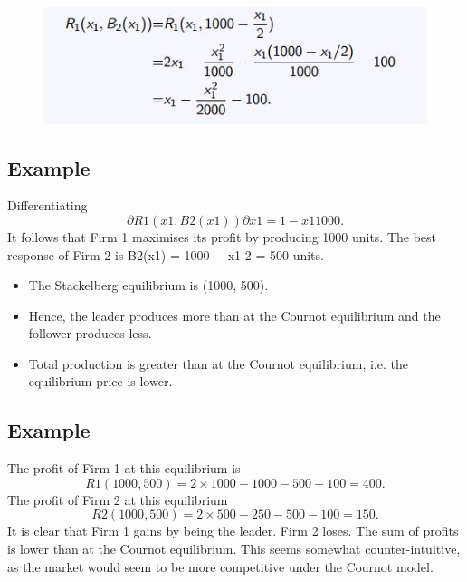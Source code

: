 \documentclass[]{report}
\begin{document}
\begin{figure}[h!]
\centering
\includegraphics[width=0.7\linewidth]{images/DR6-Slide59}
\caption{}
\label{fig:DR6-Slide59}
\end{figure}

\subsection{Example}
Differentiating
\[∂R1(x1, B2(x1))
∂x1
= 1 −
x1
1000
.\]
It follows that Firm 1 maximises its profit by producing 1000 units.
The best response of Firm 2 is B2(x1) = 1000 −
x1
2 = 500 units.
\begin{itemize}
	\item The Stackelberg equilibrium is (1000, 500).
	\item Hence, the leader
	produces more than at the Cournot equilibrium and the follower
	produces less.
\item Total production is greater than at the Cournot equilibrium, i.e.
	the equilibrium price is lower.
\end{itemize}

\subsection{Example}
The profit of Firm 1 at this equilibrium is
\[R1(1000, 500) = 2 × 1000 − 1000 − 500 − 100 = 400.\]
The profit of Firm 2 at this equilibrium
\[R2(1000, 500) = 2 × 500 − 250 − 500 − 100 = 150.\]
It is clear that Firm 1 gains by being the leader. Firm 2 loses. The
sum of profits is lower than at the Cournot equilibrium.
This seems somewhat counter-intuitive, as the market would seem
to be more competitive under the Cournot model.
\end{document}
